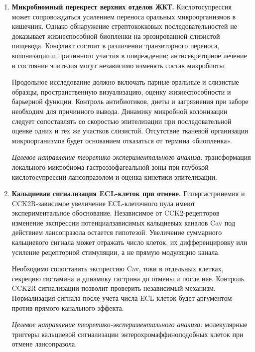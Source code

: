 \documentclass[11pt,a4paper,notitlepage]{report}
\newcommand{\src}[1]{\unskip\space\cite{#1}}
\begin{document}
\begin{enumerate}[label=\textbf{\arabic*.},start=7,leftmargin=*,itemsep=0.9\baselineskip]
\textit{Целевое направление теоретико-экспериментального анализа:} хронофармакология ночной секреции желудка и оценка роли вегетативной регуляции в возобновлении кислотопродукции после блокады АТФазы лансопразолом.

\item \textbf{Микробиомный перекрест верхних отделов ЖКТ.} Кислотосупрессия может сопровождаться усилением переноса оральных микроорганизмов в кишечник. Однако обнаружение стрептококковых последовательностей не доказывает жизнеспособной биопленки на эрозированной слизистой пищевода. Конфликт состоит в различении транзиторного переноса, колонизации и причинного участия в повреждении; антисекреторное лечение и состояние эпителия могут независимо изменять состав микробиоты.\src{safemicrotrial,safemicrocohort}

Продольное исследование должно включать парные оральные и слизистые образцы, пространственную визуализацию, оценку жизнеспособности и барьерной функции. Контроль антибиотиков, диеты и загрязнения при заборе необходим для причинного вывода. Динамику микробной колонизации следует сопоставлять со скоростью эпителизации при последовательной оценке одних и тех же участков слизистой. Отсутствие тканевой организации микроорганизмов будет основанием отказаться от термина «биопленка».

\textit{Целевое направление теоретико-экспериментального анализа:} трансформация локального микробиома гастроэзофагеальной зоны при глубокой кислотосупрессии лансопразолом и оценка кинетики эпителизации.

\item \textbf{Кальциевая сигнализация ECL-клеток при отмене.} Гипергастринемия и CCK2R-зависимое увеличение ECL-клеточного пула имеют экспериментальное обоснование. Независимое от CCK2-рецепторов изменение экспрессии потенциалзависимых кальциевых каналов Cav под действием лансопразола остается гипотезой. Увеличение суммарного кальциевого сигнала может отражать число клеток, их дифференцировку или усиление рецепторной стимуляции, а не прямую модуляцию канала.\src{withdrawsheng2020,withdrawbrand1988,withdrawboyce2017}

Необходимо сопоставить экспрессию Cav, токи в отдельных клетках, секрецию гистамина и динамику гастрина до отмены и после нее. Контроль CCK2R-сигнализации позволит проверить независимый механизм. Нормализация сигнала после учета числа ECL-клеток будет аргументом против прямого канального эффекта.

\textit{Целевое направление теоретико-экспериментального анализа:} молекулярные триггеры кальциевой сигнализации энтерохромаффиноподобных клеток при отмене лансопразола.


\end{enumerate}
\end{document}
